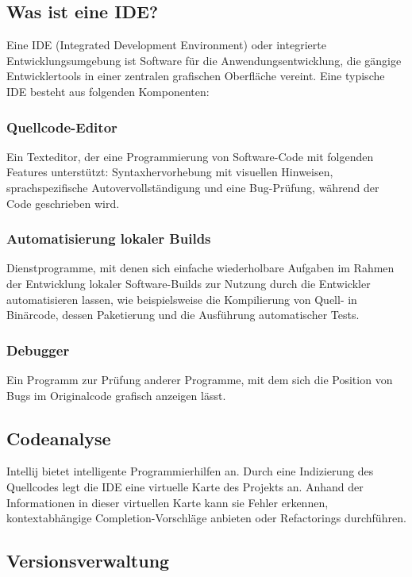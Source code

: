 \subsection{Was ist eine IDE?}

Eine IDE (Integrated Development Environment) oder integrierte Entwicklungsumgebung ist Software für die Anwendungsentwicklung, 
die gängige Entwicklertools in einer zentralen grafischen Oberfläche vereint. Eine typische IDE besteht aus folgenden Komponenten:
\cite{sysarch-intellij-2}

\subsubsection{Quellcode-Editor }
Ein Texteditor, der eine Programmierung von Software-Code mit folgenden Features unterstützt: 
Syntaxhervorhebung mit visuellen Hinweisen, sprachspezifische Autovervollständigung und eine Bug-Prüfung, während der Code geschrieben wird.
\cite{sysarch-intellij-2}

\subsubsection{Automatisierung lokaler Builds}
Dienstprogramme, mit denen sich einfache wiederholbare Aufgaben im Rahmen der Entwicklung lokaler Software-Builds zur Nutzung durch 
die Entwickler automatisieren lassen, wie beispielsweise die Kompilierung von Quell- in Binärcode, dessen Paketierung und die Ausführung automatischer Tests.
\cite{sysarch-intellij-2}

\subsubsection{Debugger}
Ein Programm zur Prüfung anderer Programme, mit dem sich die Position von Bugs im Originalcode grafisch anzeigen lässt.
\cite{sysarch-intellij-2}


\subsection{Codeanalyse}

Intellij bietet intelligente Programmierhilfen an. Durch eine Indizierung des Quellcodes legt die IDE eine virtuelle 
Karte des Projekts an. Anhand der Informationen in dieser virtuellen Karte kann sie Fehler erkennen, kontextabhängige Completion-Vorschläge anbieten oder
Refactorings durchführen.
\cite{sysarch-intellij-1}


\subsection{Versionsverwaltung}

